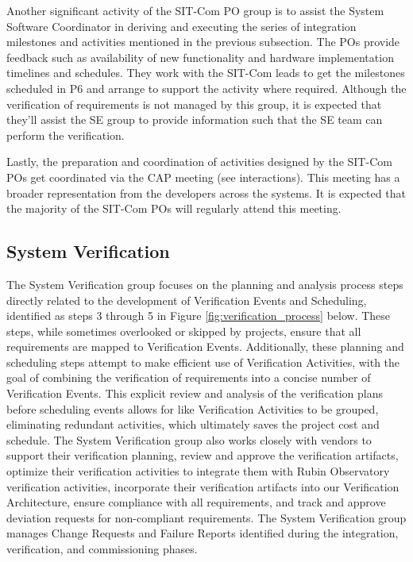 \documentclass[SE,toc]{lsstdoc}
\begin{document}
Another significant activity of the SIT-Com PO group is to assist the System Software Coordinator in deriving and executing the series of integration milestones and activities mentioned in the previous subsection.
The POs provide feedback such as availability of new functionality and hardware implementation timelines and schedules.
They work with the SIT-Com leads to get the milestones scheduled in P6 and arrange to support the activity where required.
Although the verification of requirements is not managed by this group, it is expected that they’ll assist the SE group to provide information such that the SE team can perform the verification.

Lastly, the preparation and coordination of activities designed by the SIT-Com POs get coordinated via the CAP meeting (see interactions). This meeting has a broader representation from the developers across the systems. It is expected that the majority of the SIT-Com POs will regularly attend this meeting.

\subsection{System Verification}
The System Verification group focuses on the planning and analysis process steps directly related to the development of Verification Events and Scheduling, identified as steps 3 through 5 in Figure \ref{fig:verification_process} below.
These steps, while sometimes overlooked or skipped by projects, ensure that all requirements are mapped to Verification Events.
Additionally, these planning and scheduling steps attempt to make efficient use of Verification Activities, with the goal of combining the verification of requirements into a concise number of Verification Events. 
This explicit review and analysis of the verification plans before scheduling events allows for like Verification Activities to be grouped, eliminating redundant activities, which ultimately saves the project cost and schedule. 
The System Verification group also works closely with vendors to support their verification planning, review and approve the verification artifacts, optimize their verification activities to integrate them with Rubin Observatory verification activities, incorporate their verification artifacts into our Verification Architecture, ensure compliance with all requirements, and track and approve deviation requests for non-compliant requirements. 
The System Verification group manages Change Requests and Failure Reports identified during the integration, verification, and commissioning phases.
\end{document}
